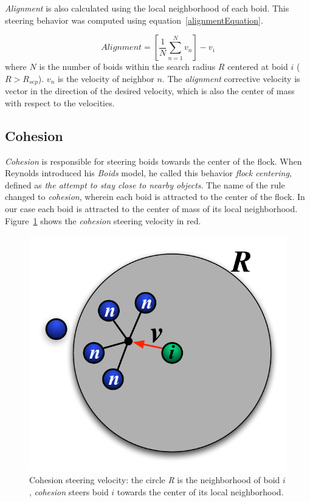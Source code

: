 \textit{Alignment} is also calculated using the local neighborhood of each boid. This steering behavior was computed using equation~\ref{alignmentEquation}.

\begin{equation}
\label{alignmentEquation}
Alignment = \left[  \frac{1}{N} \sum_{n=1}^{N} v_n \right ] - v_i
\end{equation}
where $N$ is the number of boids within the search radius $R$ centered at boid $i$ ($R>R_{sep}$). $v_n$ is the velocity of neighbor $n$. The \textit{alignment} corrective velocity is vector in the direction of the desired velocity, which is also the center of mass with respect to the velocities.

\subsection{Cohesion}
\textit{Cohesion} is responsible for steering boids towards the center of the flock. When Reynolds introduced his \textit{Boids} model, he called this behavior \textit{flock centering}, defined as \textit{the attempt to stay close to nearby objects}. The name of the rule changed to \textit{cohesion}, wherein each boid is attracted to the center of the flock. In our case each boid is attracted to the center of mass of its local neighborhood. Figure~\ref{cohesionPDF} shows the \textit{cohesion} steering velocity in red.

\begin{figure}[htbp]
\vspace{16pt}
\begin{center}
\includegraphics[scale=0.85]{figures/cohesion.pdf}
\caption{Cohesion steering velocity: the circle \textit{R} is the neighborhood of boid $i$, \textit{cohesion} steers boid $i$ towards the center of its local neighborhood.}
\label{cohesionPDF}
\end{center}
\end{figure}

